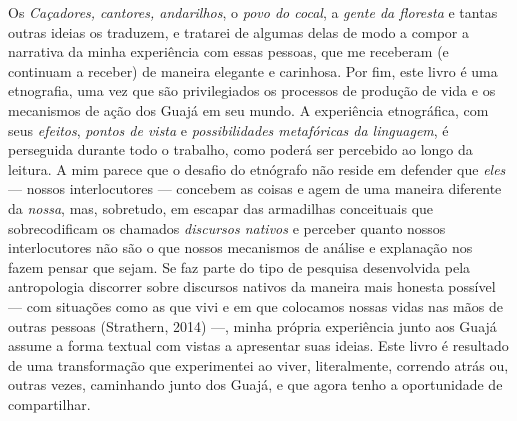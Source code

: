 Os \textit{Caçadores, cantores, andarilhos}, o \textit{povo do
cocal}, a \textit{gente da floresta} e tantas outras ideias os traduzem, e
tratarei de algumas delas de modo a compor a narrativa da minha
experiência com essas pessoas, que me receberam (e continuam a receber)
de maneira elegante e carinhosa. Por fim, este livro é uma etnografia,
uma vez que são privilegiados os processos de produção de vida e os
mecanismos de ação dos Guajá em seu mundo. A experiência
etnográfica, com seus \textit{efeitos}, \textit{pontos de vista} e
\textit{possibilidades metafóricas da linguagem}, é perseguida durante
todo o trabalho, como poderá ser percebido ao longo da leitura. A mim
parece que o desafio do etnógrafo não reside em defender que \textit{eles}
--- nossos interlocutores --- concebem as coisas e agem de uma maneira
diferente da \textit{nossa}, mas, sobretudo, em escapar das armadilhas
conceituais que sobrecodificam os chamados \textit{discursos nativos} e
perceber quanto nossos interlocutores não são o que nossos mecanismos de
análise e explanação nos fazem pensar que sejam. Se faz parte do tipo de
pesquisa desenvolvida pela antropologia discorrer sobre discursos
nativos da maneira mais honesta possível --- com situações como as que
vivi e em que colocamos nossas vidas nas mãos de outras pessoas
(Strathern, 2014) ---, minha própria experiência junto aos Guajá assume a
forma textual com vistas a apresentar suas ideias. Este livro é
resultado de uma transformação que experimentei ao viver, literalmente,
correndo atrás ou, outras vezes, caminhando junto dos Guajá, e que agora
tenho a oportunidade de compartilhar.

